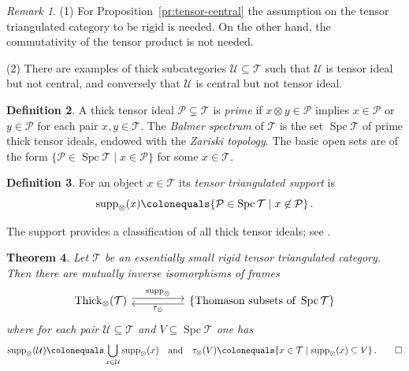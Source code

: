 \documentclass{amsart}[a4]
\newtheorem{theorem}{Theorem}[section]
\theoremstyle{definition}
\newtheorem{definition}[theorem]{Definition}
\theoremstyle{remark}
\newtheorem{remark}[theorem]{Remark}
\numberwithin{equation}{section}
\newcommand{\Spc}{\operatorname{Spc}}
\newcommand{\supp}{\operatorname{supp}}
\newcommand{\Thick}{\operatorname{Thick}}
\newcommand{\cat}{\mathcal}
\begin{document}
\begin{remark}
(1)  For Proposition~\ref{pr:tensor-central} the assumption on the tensor
  triangulated category to be rigid is needed. On the other hand, the
  commutativity of the tensor product is not needed.

(2)   There are examples of  thick subcategories $\cat
  U\subseteq \cat T$ such that $\cat U$ is tensor ideal but not
  central, and conversely that $\cat U$ is central but not tensor ideal.
\end{remark}



\begin{definition}
  A thick tensor ideal $\cat P\subsetneq\cat T$ is \emph{prime} if
  $x\otimes y\in\cat P$ implies $x\in\cat P$ or $y\in\cat P$ for each
  pair $x,y\in\cat T$.  The \emph{Balmer spectrum} of $\cat T$ is the
  set $\Spc\cat T$ of prime thick tensor ideals, endowed with the
  \emph{Zariski topology}. The basic open sets are of the form
  $\{\cat P\in \Spc\cat T\mid x\in\cat P\}$ for some $x\in\cat T$.
\end{definition}

\begin{definition}\label{de:tensor-supp}
  For an object $x\in\cat T$ its \emph{tensor triangulated support} is
\begin{equation*}
\supp_\otimes(x) \colonequals\{\cat P\in \Spc\cat T\mid x\not\in\cat P\}\,.
\end{equation*}
\end{definition}

The support provides a classification of all thick tensor ideals; see
\cite[Theorem~4.10]{Balmer:2005a}.

\begin{theorem}\pushQED{\qed}\label{th:Balmer}
  Let $\cat T$ be an essentially small rigid tensor triangulated
  category.  Then there are mutually inverse isomorphisms of frames
\begin{equation}\label{eq:Balmer-supp}
\begin{tikzcd}
\Thick_\otimes(\cat T) \ar[rr,yshift=2.5,"\supp_\otimes"] &&  \ar[ll,yshift=-2.5,"\tau_\otimes"]
\{\text{Thomason subsets of }\Spc\cat T\}
\end{tikzcd}
\end{equation}
where for each pair $\cat U\subseteq\cat T$ and $V\subseteq\Spc\cat T$ one has
\[
\supp_\otimes(\cat U)\colonequals\bigcup_{x\in\cat U}\supp_\otimes(x)\quad\text{and}\quad
  \tau_\otimes(V)\colonequals\{x\in\cat T\mid\supp_\otimes(x)\subseteq V\}\,.\qedhere
\]
\end{theorem}
\end{document}
